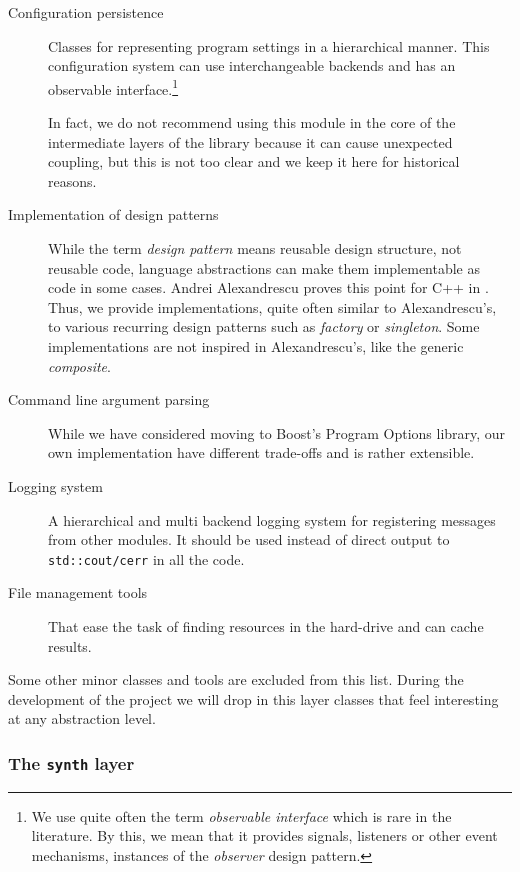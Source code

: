 \begin{description}
\item[Configuration persistence] Classes for representing program
  settings in a hierarchical manner. This configuration system can use
  interchangeable backends and has an observable
  interface.\footnote{We use quite often the term \emph{observable
      interface} which is rare in the literature. By this, we mean
    that it provides signals, listeners or other event mechanisms,
    instances of the \emph{observer} design
    pattern\cite{gamma95design}.}

  In fact, we do not recommend using this module in the core of the
  intermediate layers of the library because it can cause unexpected
  coupling, but this is not too clear and we keep it here for
  historical reasons.

\item[Implementation of design patterns] While the term \emph{design
    pattern} means reusable design structure, not reusable code,
  language abstractions can make them implementable as code in some
  cases. Andrei Alexandrescu proves this point for C++ in
  \cite{alexandrescu01modern}. Thus, we provide implementations, quite
  often similar to Alexandrescu's, to various recurring design
  patterns such as \emph{factory} or \emph{singleton}. Some
  implementations are not inspired in Alexandrescu's, like the generic
  \emph{composite}.

\item[Command line argument parsing] While we have considered moving
  to Boost's Program Options library, our own implementation have
  different trade-offs and is rather extensible.

\item[Logging system] A hierarchical and multi backend logging system
  for registering messages from other modules. It should be used
  instead of direct output to \texttt{std::cout/cerr} in all the code.

\item[File management tools] That ease the task of finding resources
  in the hard-drive and can cache results.
\end{description}

Some other minor classes and tools are excluded from this list. During
the development of the project we will drop in this layer classes that
feel interesting at any abstraction level.

\subsubsection{The \texttt{synth} layer}

